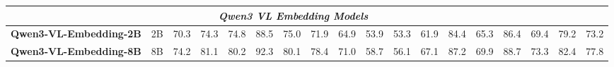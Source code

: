 \begin{table}[!t]
{\begin{tabular}{l c ccccc ccccc ccccc c}
		\midrule
		\multicolumn{17}{c}{\textbf{\emph{Qwen3 VL Embedding Models}}} \\
		\midrule
		
		\textbf{Qwen3-VL-Embedding-2B} 
        & 2B &
		70.3 & 74.3 & 74.8 & 88.5 & 75.0 & 
		71.9 & 64.9 & 53.9 & 53.3 & 61.9 & 
		84.4 & 65.3 & 86.4 & 69.4 & 79.2 & 
		73.2    \\
		
		\textbf{Qwen3-VL-Embedding-8B} 
        & 8B &
		74.2 & 81.1 & 80.2 & 92.3 & 80.1 & 
		78.4 & 71.0 & 58.7 & 56.1 & 67.1 & 
		87.2 & 69.9 & 88.7 & 73.3 & 82.4 & 
		77.8    \\
		
		\bottomrule
	\end{tabular}
}
\end{table}
